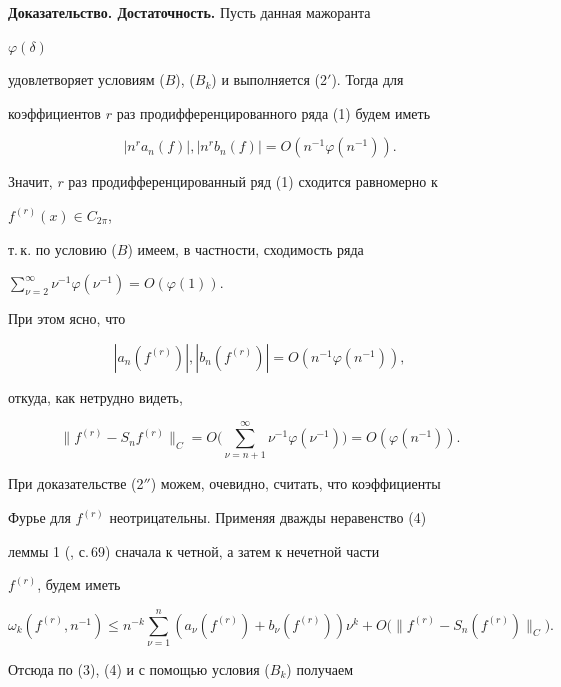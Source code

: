 {\bf Доказательство. Достаточность.} Пусть данная мажоранта


$\varphi(\delta)$


удовлетворяет условиям ($B$), ($B_k$) и выполняется (2$'$). Тогда для


коэффициентов $r$ раз продифференцированного ряда (1) будем иметь


$$


|n^r a_n(f)|,|n^r b_n(f)|=O(n^{-1}\varphi(n^{-1})).


$$


Значит, $r$ раз продифференцированный ряд (1) сходится равномерно к


$f^{(r)}(x)\in C_{2\pi}$,


т.\,к. по условию ($B$) имеем, в частности, сходимость ряда


$\sum\limits^\infty_{\nu=2}\nu^{-1}\varphi(\nu^{-1})=O(\varphi(1))$.


При этом ясно, что


\begin{equation}


|a_n(f^{(r)})|,|b_n(f^{(r)})|=O(n^{-1}\varphi(n^{-1})),


\end{equation}


откуда, как нетрудно видеть,


\begin{equation}


\|f^{(r)}-S_n f^{(r)}\|_C=O\biggl(\sum^\infty_{\nu=n+1}


\nu^{-1}\varphi(\nu^{-1})\biggr)=O(\varphi(n^{-1})).


\end{equation}


При доказательстве (2$''$) можем, очевидно, считать, что коэффициенты


Фурье для $f^{(r)}$ неотрицательны. Применяя дважды неравенство (4)


леммы 1 (\cite{G3}, с.\,69) сначала к четной, а затем к нечетной части


$f^{(r)}$, будем иметь


$$


\omega_k(f^{(r)},n^{-1})\le n^{-k}\sum^n_{\nu=1}


(a_\nu(f^{(r)})+b_\nu(f^{(r)}))\nu^k+


O\bigl(\|f^{(r)}-S_n(f^{(r)})\|_C\bigr).


$$


Отсюда по (3), (4) и с помощью условия ($B_k$) получаем


